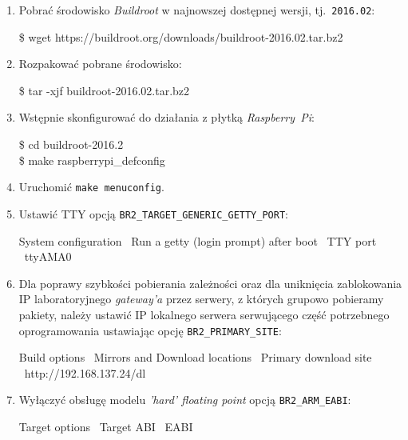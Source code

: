 \documentclass{article}
\newenvironment{ttblock}{\ttfamily}{\par}
\begin{document}
\begin{enumerate}
\item Pobrać środowisko \emph{Buildroot} w najnowszej dostępnej wersji, tj.~\texttt{2016.02}:

\begin{ttblock}
\$ wget https://buildroot.org/downloads/buildroot-2016.02.tar.bz2
\end{ttblock}

\item Rozpakować pobrane środowisko:

\begin{ttblock}
\$ tar -xjf buildroot-2016.02.tar.bz2
\end{ttblock}

\item Wstępnie skonfigurować do działania z płytką \emph{Raspberry~Pi}:

\begin{ttblock}
\$ cd buildroot-2016.2\\
\$ make raspberrypi\_defconfig
\end{ttblock}

\item Uruchomić \texttt{make menuconfig}.

\item Ustawić TTY opcją \texttt{BR2\_TARGET\_GENERIC\_GETTY\_PORT}:

\begin{ttblock}
System configuration \textrightarrow\ Run a getty (login prompt) after boot \textrightarrow\ TTY port \textrightarrow\ ttyAMA0
\end{ttblock}

\item Dla poprawy szybkości pobierania zależności oraz dla uniknięcia zablokowania IP laboratoryjnego \emph{gateway'a} przez serwery, z których grupowo pobieramy pakiety, należy ustawić IP lokalnego serwera serwującego część potrzebnego oprogramowania ustawiając opcję \texttt{BR2\_PRIMARY\_SITE}:

\begin{ttblock}
Build options \textrightarrow\ Mirrors and Download locations \textrightarrow\ Primary download site \textrightarrow\ http://192.168.137.24/dl
\end{ttblock}

\item Wyłączyć obsługę modelu \emph{'hard' floating point} opcją \texttt{BR2\_ARM\_EABI}:

\begin{ttblock}
Target options \textrightarrow\ Target ABI \textrightarrow\ EABI
\end{ttblock}


\end{enumerate}
\end{document}
